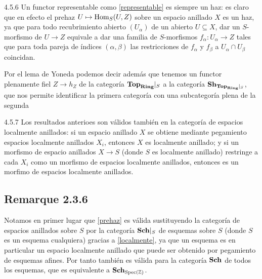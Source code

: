 \documentclass[twoside]{article}
\begin{document}
\begin{remarque}{4.5.6}
Un functor representable como \ref{representable} es siempre un haz: es claro que en efecto el prehaz $U\mapsto\operatorname{Hom}_S(U,Z)$ sobre un espacio anillado $X$ es un haz, ya que para todo recubrimiento abierto $(U_\alpha)$ de un abierto $U\subseteq X$, dar un $S$-morfismo de $U\to Z$ equivale a dar una familia de $S$-morfismos $f_\alpha:U_\alpha\to Z$ tales que para toda pareja de índices $(\alpha,\beta)$ las restricciones de $f_\alpha$ y $f_\beta$ a $U_\alpha\cap U_\beta$ coincidan.

Por el lema de Yoneda podemos decir además que tenemos un functor plenamente fiel $Z\to h_Z$ de la categoría $\mathrm{\mathbf{Top}}_{\mathrm{\mathbf{Ring}}}|_S$ a la categoría $\mathrm{\mathbf{Sh}}_{\mathrm{\mathbf{Top}}_{\mathrm{\mathbf{Ring}}}|_S}$, que nos permite identificar la primera categoría con una subcategoría plena de la segunda %


\end{remarque}

\begin{remarque}{4.5.7}\label{localmente}
Los resultados anterioes son válidos también en la categoría de espacios localmente anillados: si un espacio anillado $X$ se obtiene mediante pegamiento espacios localmente anillados $X_i$, entonces $X$ es localmente anillado; y si un morfismo de espacio anillados $X\to S$ (donde $S$ es localmente anillado) restringe a cada $X_i$ como un morfismo de espacios localmente anillados, entonces es un morfimo de espacios localmente anillados. 
\end{remarque}



\subsection{Remarque 2.3.6}

Notamos en primer lugar que \ref{prehaz} es válida sustituyendo la categoría de espacios anillados sobre $S$ por la categoría $\mathrm{\mathbf{Sch}}|_{S}$ de esquemas sobre $S$ (donde $S$ es un esquema cualquiera) gracias a \ref{localmente}, ya que un esquema es en particular un espacio localmente anillado que puede ser obtenido por pegamiento de esquemas afines. Por tanto también es válida para la categoría $\mathrm{\mathbf{Sch}}$ de todos los esquemas, que es equivalente a $\mathrm{\mathbf{Sch}}_{\operatorname{Spec}(\mathbb{Z})}$. %
\end{document}
